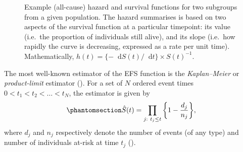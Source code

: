\documentclass[
  letterpaper,
  DIV=11,
  numbers=noendperiod]{scrreprt}
\newcommand\diff{\mathop{}\!\mathrm{d}}
\begin{document}
\begin{figure}


\caption{\label{fig-intro-haz}Example (all-cause) hazard and survival
functions for two subgroups from a given population. The hazard
summarises is based on two aspects of the survival function at a
particular timepoint: its value (i.e.~the proportion of individuals
still alive), and its slope (i.e.~how rapidly the curve is decreasing,
expressed as a rate per unit time). Mathematically,
\(h(t) = \{-\diff S(t)/\diff t\} \times S(t)^{-1}\).}

\end{figure}%

The most well-known estimator of the EFS function is the
\emph{Kaplan--Meier} or \emph{product-limit} estimator
(). For a set of \(N\) ordered event times
\(0 < t_1 < t_2 < \dots < t_N\), the estimator is given by
\begin{equation}\phantomsection\label{eq-kaplan}{
\hat{S}(t) = \prod_{j:\ t_j \leq t} \bigg\{1 - \frac{d_j}{n_j}\bigg\},
}\end{equation} where \(d_j\) and \(n_j\) respectively denote the number
of events (of any type) and number of individuals at-risk at time
\(t_j\) ().
\end{document}
